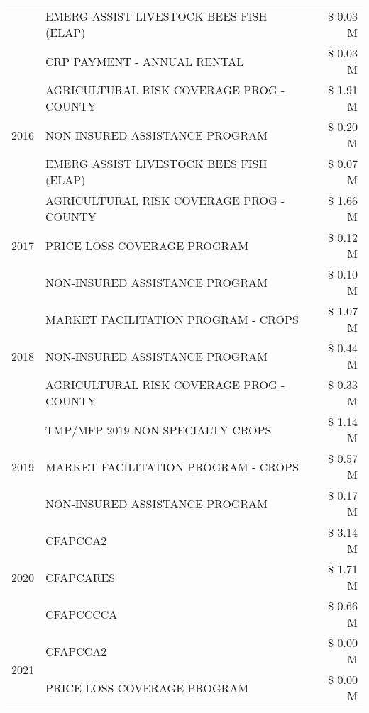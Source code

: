 \begin{tabular}{llr}
 & EMERG ASSIST LIVESTOCK BEES FISH (ELAP) & \$ 0.03 M \\
 & CRP PAYMENT - ANNUAL RENTAL & \$ 0.03 M \\
\cline{1-3}
\multirow[t]{3}{*}{2016} & AGRICULTURAL RISK COVERAGE PROG - COUNTY & \$ 1.91 M \\
 & NON-INSURED ASSISTANCE PROGRAM & \$ 0.20 M \\
 & EMERG ASSIST LIVESTOCK BEES FISH (ELAP) & \$ 0.07 M \\
\cline{1-3}
\multirow[t]{3}{*}{2017} & AGRICULTURAL RISK COVERAGE PROG - COUNTY & \$ 1.66 M \\
 & PRICE LOSS COVERAGE PROGRAM & \$ 0.12 M \\
 & NON-INSURED ASSISTANCE PROGRAM & \$ 0.10 M \\
\cline{1-3}
\multirow[t]{3}{*}{2018} & MARKET FACILITATION PROGRAM - CROPS & \$ 1.07 M \\
 & NON-INSURED ASSISTANCE PROGRAM & \$ 0.44 M \\
 & AGRICULTURAL RISK COVERAGE PROG - COUNTY & \$ 0.33 M \\
\cline{1-3}
\multirow[t]{3}{*}{2019} & TMP/MFP 2019 NON SPECIALTY CROPS & \$ 1.14 M \\
 & MARKET FACILITATION PROGRAM - CROPS & \$ 0.57 M \\
 & NON-INSURED ASSISTANCE PROGRAM & \$ 0.17 M \\
\cline{1-3}
\multirow[t]{3}{*}{2020} & CFAPCCA2 & \$ 3.14 M \\
 & CFAPCARES & \$ 1.71 M \\
 & CFAPCCCCA & \$ 0.66 M \\
\cline{1-3}
\multirow[t]{2}{*}{2021} & CFAPCCA2 & \$ 0.00 M \\
 & PRICE LOSS COVERAGE PROGRAM & \$ 0.00 M \\
\cline{1-3}
\bottomrule
\end{tabular}
